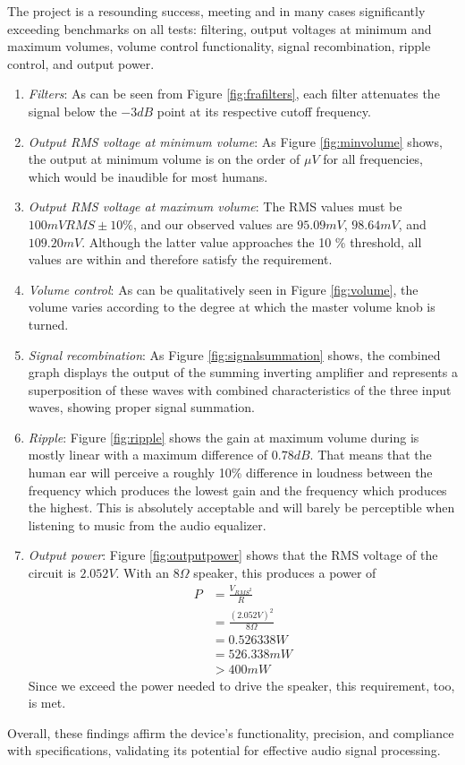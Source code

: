 \documentclass[notitlepage, 12pt]{report}
\begin{document}
The project is a resounding success, meeting and in many cases significantly exceeding benchmarks 
on all tests: filtering, output voltages at minimum and maximum volumes, volume control functionality, 
signal recombination, ripple control, and output power. 
\begin{enumerate}
    \item \emph{Filters}: As can be seen from Figure \ref{fig:frafilters}, each filter 
    attenuates the signal below the $-3dB$ point at its respective cutoff frequency. 
    \item \emph{Output RMS voltage at minimum volume}: As Figure \ref{fig:minvolume} shows, 
    the output at minimum volume is on the order of $\mu V$ for all frequencies, 
    which would be inaudible for most humans. 
    \item \emph{Output RMS voltage at maximum volume}: The RMS values must be $100 mVRMS \pm 10 \%$, 
    and our observed values are $95.09 mV$, $98.64 mV$, 
    and $109.20 mV$. Although the latter value approaches the 10 \% threshold, all values are  
    within and therefore satisfy the requirement. 
    \item \emph{Volume control}: As can be qualitatively seen in Figure \ref{fig:volume}, 
    the volume varies according to the degree at which the master volume knob is turned. 
    \item \emph{Signal recombination}: As Figure \ref{fig:signalsummation} shows, the combined 
    graph displays the output of the summing inverting amplifier and represents a superposition 
    of these waves with combined characteristics of the three input waves, showing proper signal 
    summation. 

    \item \emph{Ripple}: Figure \ref{fig:ripple} shows the gain at maximum volume during is mostly
    linear with a maximum difference of $0.78 dB$. That means 
    that the human ear will perceive a roughly 10\% difference in loudness between the frequency 
    which produces the lowest gain and the frequency which produces the highest. This is 
    absolutely acceptable and will barely be perceptible when listening to music from the 
    audio equalizer. 
    \item \emph{Output power}: Figure \ref{fig:outputpower} shows that the RMS voltage of the circuit 
    is $2.052 V$. With an $8\Omega$ speaker, this produces a power of
    \begin{align*}
        P &= \frac{V_{RMS^2}}{R} \\
        &= \frac{(2.052 V)^2}{8 \Omega} \\
        &= 0.526338 W \\
        &= 526.338 mW \\
        &>400 mW
    \end{align*}
    Since we exceed the power needed to drive the speaker, this requirement, too, is met. 
\end{enumerate}
Overall, these findings affirm the device's functionality, precision, and compliance with specifications, 
validating its potential for effective audio signal processing.
\end{document}
